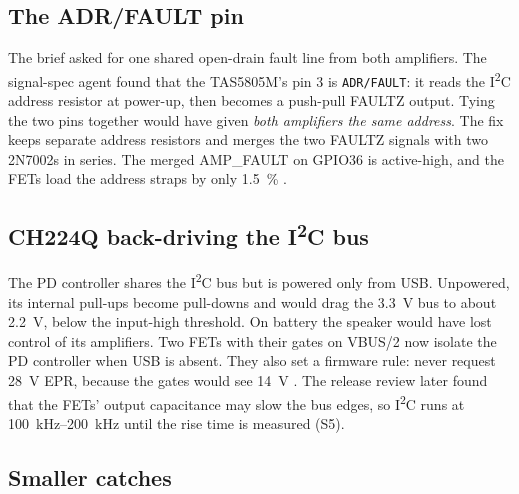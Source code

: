 \subsection{The ADR/FAULT pin}\label{sec:adr-fault}

The brief asked for one shared open-drain fault line from both amplifiers. The signal-spec agent found that the TAS5805M's pin 3 is \texttt{ADR/FAULT}: it reads the I\textsuperscript{2}C address resistor at power-up, then becomes a push-pull FAULTZ output. Tying the two pins together would have given \emph{both amplifiers the same address}. The fix keeps separate address resistors and merges the two FAULTZ signals with two 2N7002s in series. The merged AMP\_FAULT on GPIO36 is active-high, and the FETs load the address straps by only \qty{1.5}{\percent} .

\subsection{CH224Q back-driving the I\texorpdfstring{\textsuperscript{2}}{2}C bus}\label{sec:ch224q}

The PD controller shares the I\textsuperscript{2}C bus but is powered only from USB. Unpowered, its internal pull-ups become pull-downs and would drag the \qty{3.3}{\volt} bus to about \qty{2.2}{\volt}, below the input-high threshold. On battery the speaker would have lost control of its amplifiers. Two FETs with their gates on VBUS/2 now isolate the PD controller when USB is absent. They also set a firmware rule: never request \qty{28}{\volt} EPR, because the gates would see \qty{14}{\volt} . The release review later found that the FETs' output capacitance may slow the bus edges, so I\textsuperscript{2}C runs at \qtyrange{100}{200}{\kilo\hertz} until the rise time is measured (S5).

\subsection{Smaller catches}\label{sec:smaller-catches}

